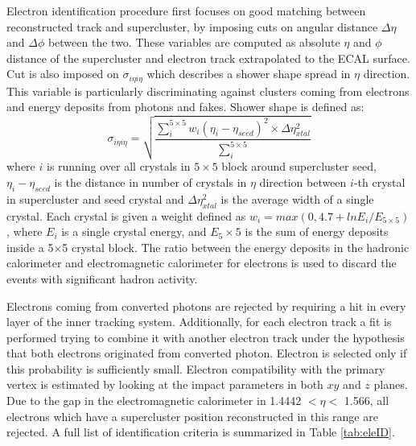 Electron identification procedure first focuses on good matching between reconstructed track and supercluster, by imposing cuts on angular distance $\Delta \eta$ and $\Delta \phi$ between the two. These variables are computed as absolute $\eta$ and $\phi$ distance of the supercluster and electron track extrapolated to the ECAL surface. Cut is also imposed on $\sigma_{i\eta i\eta}$ which describes a shower shape spread in $\eta$ direction. This variable is particularly discriminating against clusters coming from electrons and energy deposits from photons and fakes. Shower shape is defined as:
\begin{equation}
\sigma_{i\eta i\eta} = \sqrt{\frac{\sum_{i}^{5\times 5} w_i(\eta_i-\eta_{seed})^2\times \Delta \eta^2_{xtal} }{\sum_{i}^{5\times 5}}}
\end{equation}
where $i$ is running over all crystals in $5\times5$ block around supercluster seed, $\eta_i-\eta_{seed}$ is the distance in number of crystals in $\eta$ direction between $i$-th crystal in supercluster and seed crystal and $\Delta \eta^2_{xtal}$ is the average width of a single crystal. Each crystal is given a weight defined as $w_i=max(0,4.7+lnE_i/E_{5\times5})$, where $E_i$ is a single crystal energy, and $E_5\times 5$ is the sum of energy deposits inside a 5$\times$5 crystal block. 
The ratio between the energy deposits in the hadronic calorimeter and electromagnetic calorimeter for electrons is used to discard the events with significant hadron activity.
\par Electrons coming from converted photons are rejected by requiring a hit in every layer of the inner tracking system. Additionally, for each electron track a fit is performed trying to combine it with another electron track under the hypothesis that both electrons originated from converted photon. Electron is selected only if this probability is sufficiently small. Electron compatibility with the primary vertex is estimated by looking at the impact parameters in both $xy$ and $z$ planes. Due to the gap in the electromagnetic calorimeter in 1.4442 $< \eta <$ 1.566, all electrons which have a supercluster position reconstructed in this range are rejected. A full list of identification criteria is summarized in Table \ref{tab:eleID}.
